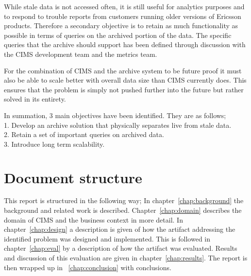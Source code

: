 While stale data is not accessed often, it is still useful for analytics purposes and to respond to trouble reports from customers running older versions of Ericsson products. Therefore a secondary objective is to retain as much functionality as possible in terms of queries on the archived portion of the data. The specific queries that the archive should support has been defined through discussion with the CIMS development team and the metrics team.

For the combination of CIMS and the archive system to be future proof it must also be able to scale better with overall data size than CIMS currently does. This ensures that the problem is simply not pushed further into the future but rather solved in its entirety.

In summation, 3 main objectives have been identified. They are as follows;\\
1. Develop an archive solution that physically separates live from stale data.\\
2. Retain a set of important queries on archived data.\\
3. Introduce long term scalability. \\


\section{Document structure}
This report is structured in the following way; In chapter~\ref{chap:background} the background and related work is described. Chapter~\ref{chap:domain} describes the domain of CIMS and the business context in more detail. In chapter~\ref{chap:design} a description is given of how the artifact addressing the identified problem was designed and implemented.
This is followed in chapter~\ref{chap:eval} by a description of how the artifact was evaluated. Results and discussion of this evaluation are given in chapter~\ref{chap:results}. The report is then wrapped up in ~\ref{chap:conclusion} with conclusions.


